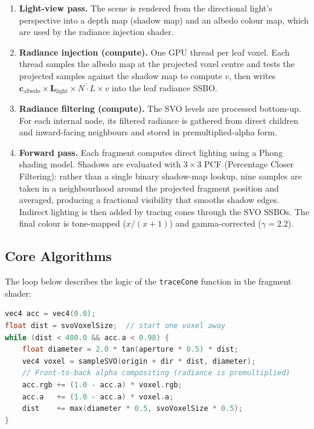 \documentclass[12pt]{article}
\begin{document}
\begin{enumerate}
    \item \textbf{Light-view pass.} The scene is rendered from the directional light's perspective into a depth map (shadow map) and an albedo colour map, which are used by the radiance injection shader.

    \item \textbf{Radiance injection (compute).} One GPU thread per leaf voxel. Each thread samples the albedo map at the projected voxel centre and tests the projected samples against the shadow map to compute $v$, then writes $\mathbf{c}_\text{albedo} \times \mathbf{L}_\text{light} \times \overline{N \cdot L} \times v$ into the leaf radiance SSBO.

    \item \textbf{Radiance filtering (compute).} The SVO levels are processed bottom-up. For each internal node, its filtered radiance is gathered from direct children and inward-facing neighbours and stored in premultiplied-alpha form.

    \item \textbf{Forward pass.} Each fragment computes direct lighting using a Phong shading model. Shadows are evaluated with $3\times3$ PCF (Percentage Closer Filtering): rather than a single binary shadow-map lookup, nine samples are taken in a neighbourhood around the projected fragment position and averaged, producing a fractional visibility that smooths shadow edges. Indirect lighting is then added by tracing cones through the SVO SSBOs. The final colour is tone-mapped ($x/(x+1)$) and gamma-corrected ($\gamma = 2.2$).
\end{enumerate}

\subsection{Core Algorithms}

The loop below describes the logic of the \texttt{traceCone} function in the fragment shader:
\newpage
\begin{lstlisting}[language=C, caption={Voxel cone tracing accumulation loop}]
vec4 acc = vec4(0.0);
float dist = svoVoxelSize;  // start one voxel away
while (dist < 400.0 && acc.a < 0.98) {
    float diameter = 2.0 * tan(aperture * 0.5) * dist;
    vec4 voxel = sampleSVO(origin + dir * dist, diameter);
    // Front-to-back alpha compositing (radiance is premultiplied)
    acc.rgb += (1.0 - acc.a) * voxel.rgb;
    acc.a   += (1.0 - acc.a) * voxel.a;
    dist    += max(diameter * 0.5, svoVoxelSize * 0.5);
}
\end{lstlisting}
\end{document}
